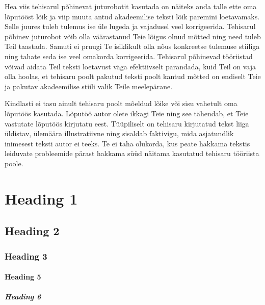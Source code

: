 Hea viis tehisarul põhinevat juturobotit kasutada on näiteks anda talle ette oma lõputööst lõik ja viip muuta antud akadeemilise teksti lõik paremini loetavamaks. Selle juures tuleb tulemus ise üle lugeda ja vajadusel veel korrigeerida. Tehisarul põhinev juturobot võib olla väärastanud Teie lõigus olnud mõtted ning need tuleb Teil taastada. Samuti ei pruugi Te isiklikult olla nõus konkreetse tulemuse stiiliga ning tahate seda ise veel omakorda korrigeerida. Tehisarul põhinevad tööriistad võivad aidata Teil teksti loetavust väga efektiivselt parandada, kuid Teil on vaja olla hoolas, et tehisaru poolt pakutud teksti poolt kantud mõtted on endiselt Teie ja pakutav akadeemilise stiili valik Teile meelepärane.

Kindlasti ei tasu ainult tehisaru poolt mõeldud lõike või sisu vahetult oma lõputöös kasutada. Lõputöö autor olete ikkagi Teie ning see tähendab, et Teie vastutate lõputöös kirjutatu eest. Tüüpiliselt on tehisaru kirjutatud tekst liiga üldistav, ülemäära illustratiivne ning sisaldab faktivigu, mida asjatundlik inimesest teksti autor ei teeks. Te ei taha olukorda, kus peate hakkama tekstis leiduvate probleemide pärast hakkama süüd näitama kasutatud tehisaru tööriista poole.

\section{Heading 1}
\subsection{Heading 2}
\subsubsection{Heading 3}
\paragraph{Heading 5}
\subparagraph{Heading 6}
